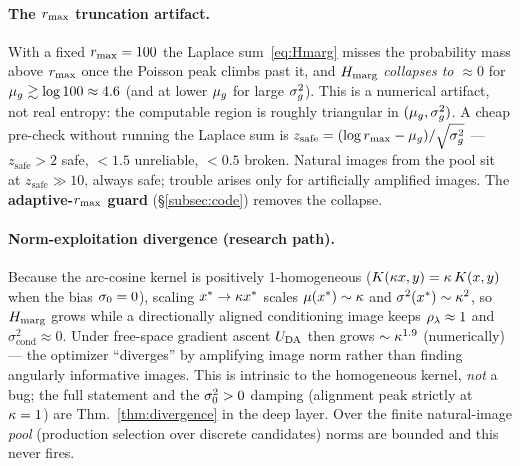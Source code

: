 \paragraph{The $r_{\max}$ truncation artifact.}
With a fixed $r_{\max}=100$ the Laplace sum~\eqref{eq:Hmarg} misses the probability
mass above $r_{\max}$ once the Poisson peak climbs past it, and $H_{\mathrm{marg}}$
\emph{collapses to $\approx0$} for $\mu_{g}\gtrsim\log100\approx4.6$ (and at lower
$\mu_{g}$ for large $\sigma_{g}^{2}$). This is a numerical artifact, not real entropy: the
computable region is roughly triangular in $(\mu_{g},\sigma_{g}^{2})$. A cheap pre-check
without running the Laplace sum is $z_{\mathrm{safe}}=(\log r_{\max}-\mu_{g})/\sqrt{\sigma_{g}^{2}}$
--- $z_{\mathrm{safe}}>2$ safe, $<1.5$ unreliable, $<0.5$ broken. Natural images
from the pool sit at $z_{\mathrm{safe}}\gg10$, always safe; trouble arises only for
artificially amplified images. The \textbf{adaptive-$r_{\max}$ guard}
(\S\ref{subsec:code}) removes the collapse.

\paragraph{Norm-exploitation divergence (research path).}
Because the arc-cosine kernel is positively $1$-homogeneous
($K(\kappa x,y)=\kappa\,K(x,y)$ when the bias $\sigma_{0}=0$), scaling
$x^{*}\to\kappa x^{*}$ scales $\mu(x^{*})\sim\kappa$ and $\sigma^{2}(x^{*})\sim\kappa^{2}$,
so $H_{\mathrm{marg}}$ grows while a directionally aligned conditioning image keeps
$\rho_{\lambda}\approx1$ and $\sigma^{2}_{\mathrm{cond}}\approx0$. Under free-space gradient
ascent $U_{\mathrm{DA}}$ then grows $\sim\kappa^{1.9}$ (numerically) --- the optimizer
``diverges'' by amplifying image norm rather than finding angularly informative
images. This is intrinsic to the homogeneous kernel, \emph{not} a bug; the full
statement and the $\sigma_{0}^{2}>0$ damping (alignment peak strictly at $\kappa=1$) are
Thm.~\ref{thm:divergence} in the deep layer. Over the finite natural-image
\emph{pool} (production selection over discrete candidates) norms are bounded and
this never fires.


